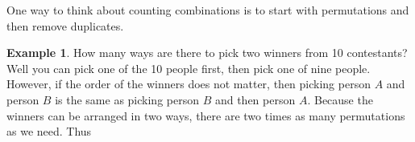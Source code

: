 \documentclass[]{article}
\theoremstyle{definition}
\newtheorem{exmp}{Example}[section]
\begin{document}
One way to think about counting combinations is to start with permutations and then remove duplicates. 

\begin{exmp}
How many ways are there to pick two winners from 10 contestants? Well you can pick one of the 10 people first, then pick one of nine people. However, if the order of the winners does not matter, then picking person $A$ and person $B$ is the same as picking person $B$ and then person $A$. Because the winners can be arranged in two ways, there are two times as many permutations as we need. Thus 
\end{exmp} 
\end{document}
